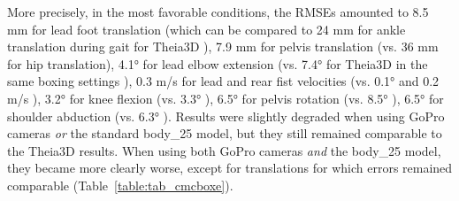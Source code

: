 More precisely, in the most favorable conditions, the RMSEs amounted to 8.5 mm for lead foot translation (which can be compared to 24 mm for ankle translation during gait for Theia3D \cite{Kanko2021b}), 7.9 mm for pelvis translation (vs. 36 mm for hip translation), 4.1° for lead elbow extension (vs. 7.4° for Theia3D in the same boxing settings \cite{Lahkar2022b}), 0.3 m/s for lead and rear fist velocities (vs. 0.1° and 0.2 m/s \cite{Lahkar2022b}), 3.2° for knee flexion (vs. 3.3° \cite{Kanko2021b}), 6.5° for pelvis rotation (vs. 8.5° \cite{Kanko2021b}), 6.5° for shoulder abduction (vs. 6.3° \cite{Lahkar2022b}). Results were slightly degraded when using GoPro cameras \emph{or} the standard body\_25 model, but they still remained comparable to the Theia3D results. When using both GoPro cameras \emph{and} the body\_25 model, they became more clearly worse, except for translations for which errors remained comparable (Table~\ref{table:tab_cmcboxe}).

